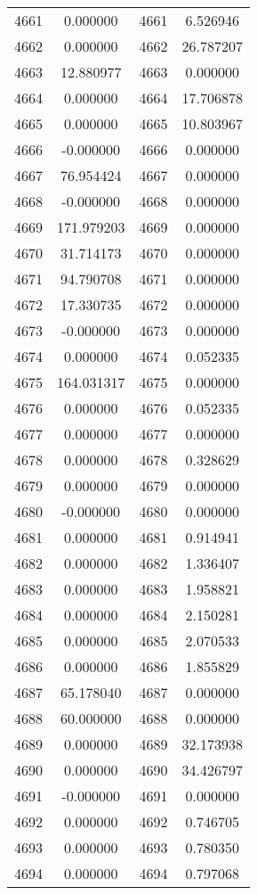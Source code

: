 \documentclass[12pt]{article}
\begin{document}
\begin{longtable}{@{}cccc@{}}
4661 & 0.000000 & 4661 & 6.526946 \\
4662 & 0.000000 & 4662 & 26.787207 \\
4663 & 12.880977 & 4663 & 0.000000 \\
4664 & 0.000000 & 4664 & 17.706878 \\
4665 & 0.000000 & 4665 & 10.803967 \\
4666 & -0.000000 & 4666 & 0.000000 \\
4667 & 76.954424 & 4667 & 0.000000 \\
4668 & -0.000000 & 4668 & 0.000000 \\
4669 & 171.979203 & 4669 & 0.000000 \\
4670 & 31.714173 & 4670 & 0.000000 \\
4671 & 94.790708 & 4671 & 0.000000 \\
4672 & 17.330735 & 4672 & 0.000000 \\
4673 & -0.000000 & 4673 & 0.000000 \\
4674 & 0.000000 & 4674 & 0.052335 \\
4675 & 164.031317 & 4675 & 0.000000 \\
4676 & 0.000000 & 4676 & 0.052335 \\
4677 & 0.000000 & 4677 & 0.000000 \\
4678 & 0.000000 & 4678 & 0.328629 \\
4679 & 0.000000 & 4679 & 0.000000 \\
4680 & -0.000000 & 4680 & 0.000000 \\
4681 & 0.000000 & 4681 & 0.914941 \\
4682 & 0.000000 & 4682 & 1.336407 \\
4683 & 0.000000 & 4683 & 1.958821 \\
4684 & 0.000000 & 4684 & 2.150281 \\
4685 & 0.000000 & 4685 & 2.070533 \\
4686 & 0.000000 & 4686 & 1.855829 \\
4687 & 65.178040 & 4687 & 0.000000 \\
4688 & 60.000000 & 4688 & 0.000000 \\
4689 & 0.000000 & 4689 & 32.173938 \\
4690 & 0.000000 & 4690 & 34.426797 \\
4691 & -0.000000 & 4691 & 0.000000 \\
4692 & 0.000000 & 4692 & 0.746705 \\
4693 & 0.000000 & 4693 & 0.780350 \\
4694 & 0.000000 & 4694 & 0.797068 \\

\end{longtable}
\end{document}
